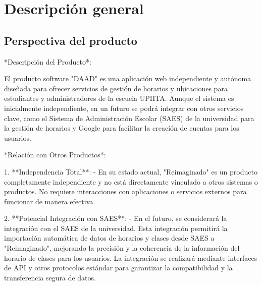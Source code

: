 \section{Descripción general}

\subsection{Perspectiva del producto}

*Descripción del Producto*:

El producto software "DAAD" es una aplicación web independiente y autónoma diseñada para ofrecer servicios de gestión de horarios y ubicaciones para estudiantes y administradores de la escuela UPIITA. Aunque el sistema es inicialmente independiente, en un futuro se podrá integrar con otros servicios clave, como el Sistema de Administración Escolar (SAES) de la universidad para la gestión de horarios y Google para facilitar la creación de cuentas para los usuarios.

*Relación con Otros Productos*:

1. **Independencia Total**:
   - En su estado actual, "Reimaginado" es un producto completamente independiente y no está directamente vinculado a otros sistemas o productos. No requiere interacciones con aplicaciones o servicios externos para funcionar de manera efectiva.

2. **Potencial Integración con SAES**:
   - En el futuro, se considerará la integración con el SAES de la universidad. Esta integración permitirá la importación automática de datos de horarios y clases desde SAES a "Reimaginado", mejorando la precisión y la coherencia de la información del horario de clases para los usuarios. La integración se realizará mediante interfaces de API y otros protocolos estándar para garantizar la compatibilidad y la transferencia segura de datos.
   

